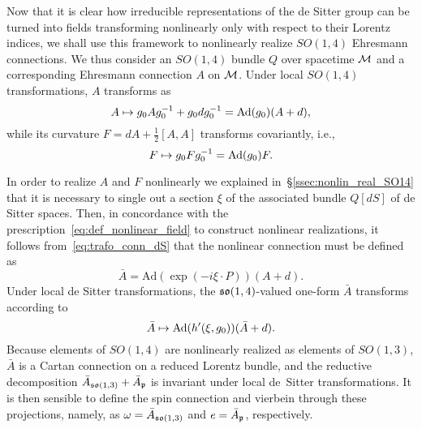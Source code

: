 \documentclass[
final,
11pt,
a4paper,
DIV=11,
headinclude=true,
footinclude=false,
bibliography=totoc,
twoside=true,  %
BCOR=5mm
]{scrbook}
\begin{document}
Now that it is clear how irreducible representations of the de 
Sitter group can be turned into fields transforming nonlinearly 
only with respect to their Lorentz indices, we shall use this 
framework to nonlinearly realize $SO(1,4)$ Ehresmann connections.  
We thus consider an $SO(1,4)$ bundle $Q$ over spacetime $\mathcal{M}$ 
and a corresponding Ehresmann connection $A$ on $\mathcal{M}$. Under 
local $SO(1,4)$ transformations, $A$ transforms as
\begin{equation}
\label{eq:trafo_conn_dS}
  A \mapsto g_0 A g_0^{-1} + g_0  dg_0^{-1} = \operatorname{Ad}(g_0)(A + d),
\end{equation}
while its curvature $F = dA + \tfrac{1}{2}[A, A]$ transforms 
covariantly, i.e.,
\begin{equation}
\label{eq:trafo_curv_dS}
  F \mapsto g_0 F g_0^{-1} = \operatorname{Ad}(g_0) F.
\end{equation}

In order to realize $A$ and $F$ nonlinearly we explained 
in~\S\ref{ssec:nonlin_real_SO14} that it is necessary to single 
out a section $\xi$ of the associated bundle $Q[dS]$ of de Sitter 
spaces. Then, in concordance with the 
prescription~\eqref{eq:def_nonlinear_field} to construct 
nonlinear realizations, it follows from~\eqref{eq:trafo_conn_dS} 
that the nonlinear connection must be defined 
as~\cite{stelle.west:1980ds}
\begin{equation}
\label{eq:A_nonlin}
  \bar{A} = \mathrm{Ad}(\exp(-i\xi\cdot P))(A + d).
\end{equation}
Under local de Sitter transformations, the $\mathfrak{so}(1,4)$-valued 
one-form $\bar{A}$ transforms according to
\begin{equation*}
  \bar{A} \mapsto \operatorname{Ad}(h'(\xi,g_0))(\bar{A}+d).
\end{equation*}
Because elements of $SO(1,4)$ are nonlinearly realized as 
elements of $SO(1,3)$, $\bar{A}$ is a Cartan connection on 
a reduced Lorentz bundle, and the reductive decomposition 
$\bar{A}_{\mathfrak{so}(1,3)} + \bar{A}_\mathfrak{p}$ is invariant under 
local de~Sitter transformations.  It is then sensible to define 
the spin connection and vierbein through these projections, 
namely, as $\omega = \bar{A}_{\mathfrak{so}(1,3)}$ and $e 
= \bar{A}_\mathfrak{p}$, respectively.
\end{document}
